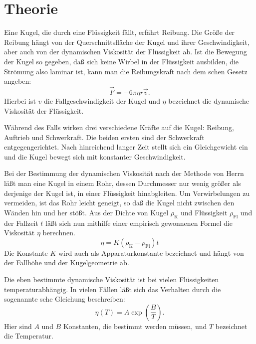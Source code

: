\section{Theorie}

Eine Kugel, die durch eine Flüssigkeit fällt, erfährt Reibung. Die Größe
der Reibung hängt von der Querschnittsfläche der Kugel und ihrer
Geschwindigkeit, aber auch von der dynamischen Viskosität der
Flüssigkeit ab. Ist die Bewegung der Kugel so gegeben, daß sich keine
Wirbel in der Flüssigkeit ausbilden, die Strömung also laminar ist, kann
man die Reibungskraft nach dem schen Gesetz angeben:
\begin{equation}
  \label{eq:stokes}
  \vec{F} = -6 \pi \eta r \vec{v}.
\end{equation}
Hierbei ist $v$ die Fallgeschwindigkeit der Kugel und $\eta$ bezeichnet
die dynamische Viskosität der Flüssigkeit.

Während des Falls wirken drei verschiedene Kräfte auf die Kugel:
Reibung, Auftrieb und Schwerkraft. Die beiden ersten sind der
Schwerkraft entgegengerichtet. Nach hinreichend langer Zeit stellt sich
ein Gleichgewicht ein und die Kugel bewegt sich mit konstanter
Geschwindigkeit.

Bei der Bestimmung der dynamischen Viskosität nach der Methode von Herrn
 läßt man eine Kugel in einem Rohr, dessen Durchmesser nur
wenig größer als derjenige der Kugel ist, in einer Flüssigkeit
hinabgleiten. Um Verwirbelungen zu vermeiden, ist das Rohr leicht
geneigt, so daß die Kugel nicht zwischen den Wänden hin und her stößt.
Aus der Dichte von Kugel $\rho_\text{K}$ und Flüssigkeit
$\rho_\text{Fl}$ und der Fallzeit $t$ läßt sich nun mithilfe einer
empirisch gewonnenen Formel die Viskosität $\eta$ berechnen.
\begin{equation}
  \label{eq:empirie}
  \eta = K(\rho_\text{K} - \rho_\text{Fl})t
\end{equation}
Die Konstante $K$ wird auch als Apparaturkonstante bezeichnet und hängt
von der Fallhöhe und der Kugelgeometrie ab.

Die eben bestimmte dynamische Viskosität ist bei vielen Flüssigkeiten
temperaturabhängig. In vielen Fällen läßt sich das Verhalten durch die
sogenannte sche Gleichung beschreiben:
\begin{equation}
  \label{eq:andrade}
  \eta(T) = A \exp \left( \frac{B}{T} \right).
\end{equation}
Hier sind $A$ und $B$ Konstanten, die bestimmt werden müssen, und $T$
bezeichnet die Temperatur.
